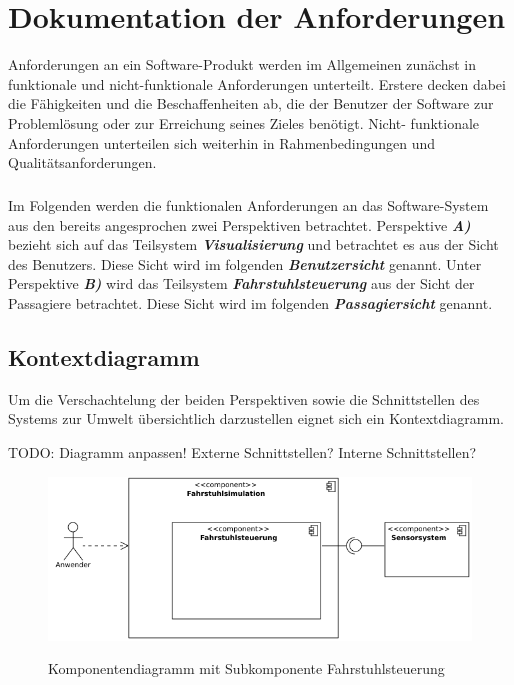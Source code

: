 \chapter{Dokumentation der Anforderungen}
Anforderungen an ein Software-Produkt werden im Allgemeinen zunächst in funktionale und nicht-funktionale Anforderungen unterteilt. Erstere decken dabei die Fähigkeiten und die Beschaffenheiten ab, die der Benutzer der Software zur Problemlösung oder zur Erreichung seines Zieles benötigt. Nicht- funktionale Anforderungen unterteilen sich weiterhin in Rahmenbedingungen und Qualitätsanforderungen.

\paragraph{}
Im Folgenden werden die funktionalen Anforderungen an das Software-System aus den bereits angesprochen zwei Perspektiven betrachtet. Perspektive \textit{\textbf{A)}} bezieht sich auf das Teilsystem \textit{\textbf{\gls{Visualisierung}}} und betrachtet es aus der Sicht des Benutzers. Diese Sicht wird im folgenden \textit{\textbf{Benutzersicht}} genannt. Unter Perspektive \textit{\textbf{B)}} wird das Teilsystem \textit{\textbf{\gls{Fahrstuhlsteuerung}}} aus der Sicht der Passagiere betrachtet. Diese Sicht wird im folgenden \textit{\textbf{Passagiersicht}} genannt.

\newpage
\section{Kontextdiagramm}
Um die Verschachtelung der beiden Perspektiven sowie die Schnittstellen des Systems zur Umwelt übersichtlich darzustellen eignet sich ein Kontextdiagramm.

TODO: Diagramm anpassen! Externe Schnittstellen? Interne Schnittstellen?

\begin{figure}[hbt]
	\includegraphics{images/komponentendiagramm.png}
	\label{fig:komponentendiagramm}
	\caption{Komponentendiagramm mit Subkomponente Fahrstuhlsteuerung}
\end{figure}

